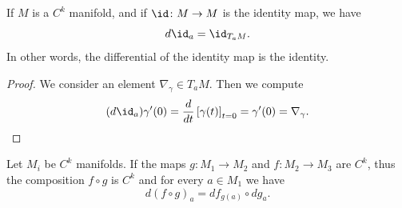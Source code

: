\begin{lemma}       \label{LEMooEGITooXbAPDe}
	If \( M\) is a \( C^k\) manifold, and if \( \id\colon M\to M\) is the identity map, we have
	\begin{equation}
		d\id_a=\id_{T_aM}.
	\end{equation}
	In other words, the differential of the identity map is the identity.
\end{lemma}

\begin{proof}
	We consider an element \( \nabla_{\gamma}\in T_aM\). Then we compute
	\begin{equation}
		(d\id_a)\gamma'(0)=\frac{d}{dt} \left[ \gamma(t)  \right]_{t=0}=\gamma'(0)=\nabla_{\gamma}.
	\end{equation}
\end{proof}

\begin{lemma}       \label{LEMooGRRAooXxDMuw}
	Let \( M_i\) be \( C^k\) manifolds. If the maps \( g\colon M_1\to M_2\) and \( f\colon M_2\to M_3 \) are \( C^k\), thus the composition \( f\circ g\) is \( C^k\) and for every \( a\in M_1\) we have
	\begin{equation}
		d(f\circ g)_a=df_{g(a)}\circ dg_a.
	\end{equation}
\end{lemma}

